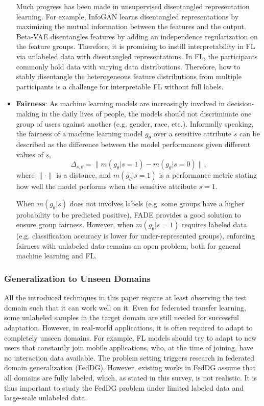 \documentclass[11pt]{article}
\begin{document}
\begin{itemize}
    Much progress has been made in unsupervised disentangled representation learning. For example, InfoGAN \cite{chen2016infogan} learns disentangled representations by maximizing the mutual information between the features and the output. Beta-VAE \cite{higgins2017beta} disentangles features by adding an independence regularization on the feature groups. Therefore, it is promising to instill interpretability in FL via unlabeled data with disentangled representations. In FL, the participants commonly hold data with varying data distributions. Therefore, how to stably disentangle the heterogeneous feature distributions from multiple participants is a challenge for interpretable FL without full labels. 

    \item \textbf{Fairness}: As machine learning models are increasingly involved in decision-making in the daily lives of people, the models should not discriminate one group of users against another (e.g. gender, race, etc.). Informally speaking, the fairness of a machine learning model $g_\theta$ over a sensitive attribute $s$ can be described as the difference between the model performances given different values of $s$, 
    \begin{equation}
        \Delta_{s, \theta} = \|m(g_\theta|s=1) - m(g_\theta|s=0)\|,
        \label{eqn:fairness}
    \end{equation}
    where $\|\cdot \|$ is a distance, and $m(g_\theta|s=1)$ is a performance metric stating how well the model performs when the sensitive attribute $s=1$. 
    
    When $m(g_\theta|s)$ does not involves labels (e.g. some groups have a higher probability to be predicted positive), FADE \cite{hong2021federated} provides a good solution to ensure group fairness. However, when $m(g_\theta|s=1)$ requires labeled data (e.g. classification accuracy is lower for under-represented groups), enforcing fairness with unlabeled data remains an open problem, both for general machine learning and FL. 
\end{itemize}

\subsubsection{Generalization to Unseen Domains}
All the introduced techniques in this paper require at least observing the test domain such that it can work well on it. Even for federated transfer learning, some unlabeled samples in the target domain are still needed for successful adaptation. However, in real-world applications, it is often required to adapt to completely unseen domains. For example, FL models should try to adapt to new users that constantly join mobile applications, who, at the time of joining, have no interaction data available. The problem setting triggers research in federated domain generalization (FedDG). However, existing works in FedDG \cite{liu2021feddg,nguyen2022fedsr} assume that all domains are fully labeled, which, as stated in this survey, is not realistic. It is thus important to study the FedDG problem under limited labeled data and large-scale unlabeled data. 
\end{document}
